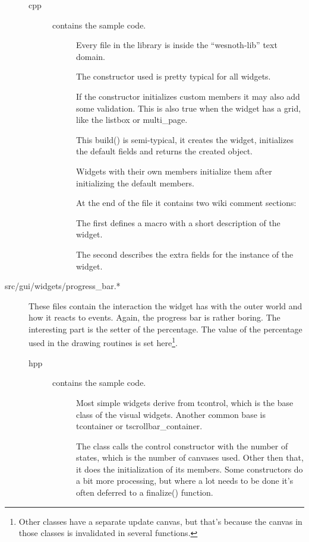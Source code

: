 \begin{description}
\begin{description}
\item[cpp]  contains the sample code.
	\begin{description}
	\item[] Every file in the library
		is inside the ``wesnoth-lib'' text domain.
	\item[] The constructor used is
		pretty typical for all widgets.

		If the constructor initializes custom members it may also add some validation.
		This is also true when the widget has a grid, like the listbox or
		multi\_page.
	\item[]
		This build() is semi-typical, it creates the widget, initializes the
		default fields and returns the created object.

		Widgets with their own members initialize them after initializing the
		default members.
	\item[]
		At the end of the file it contains two wiki comment sections:

		The first defines a macro with a short description of the widget.

		The second describes the extra fields for the instance of the widget.
	\end{description}
\end{description}

\item[src/gui/widgets/progress\_bar.*]
	These files contain the interaction the widget has with the outer world and
	how it reacts to events. Again, the progress bar is rather boring. The
	interesting part is the setter of the percentage. The value of the
	percentage used in the drawing routines is set here\footnote{Other classes have a
	separate update canvas, but that's because the canvas in those classes is
	invalidated in several functions.}.

\begin{description}
\item[hpp]  contains the sample code.
	\begin{description}
	\item[]
		Most simple widgets derive from tcontrol, which is the base class of the
		visual widgets. Another common base is tcontainer or
		tscrollbar\_container.

	\item[]
		The class calls the control constructor with the number of states, which
		is the number of canvases used. Other then that, it does the
		initialization of its members. Some constructors do a bit more
		processing, but where a lot needs to be done it's often deferred to a
		finalize() function.


\end{description}
\end{description}
\end{description}
